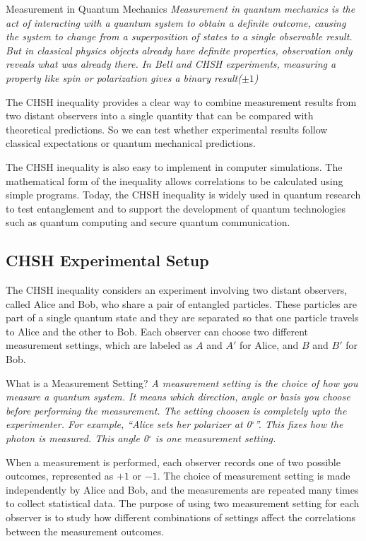 \documentclass[14pt,a4paper]{extarticle}
\begin{document}
\begin{conceptbox}{Measurement in Quantum Mechanics}
\textit{Measurement in quantum mechanics is the act of interacting with a quantum system to obtain a definite outcome, causing the system to change from a superposition of states to a single observable result. But in classical physics objects already have definite properties, observation only reveals what was already there. In Bell and CHSH experiments, measuring a property like spin or polarization gives a binary result($\pm1$)}
\end{conceptbox}

The CHSH inequality provides a clear way to combine measurement results from two distant observers into a single quantity that can be compared with theoretical predictions. So we can test whether experimental results follow classical expectations or quantum mechanical predictions.

The CHSH inequality is also easy to implement in computer simulations. The mathematical form of the inequality allows correlations to be calculated using simple programs. Today, the CHSH inequality is widely used in quantum research to test entanglement and to support the development of quantum technologies such as quantum computing and secure quantum communication.

\subsection{CHSH Experimental Setup}
The CHSH inequality considers an experiment involving two distant observers, called Alice and Bob, who share a pair of entangled particles. These particles are part of a single quantum state and they are separated so that one particle travels to Alice and the other to Bob. Each observer can choose two different measurement settings, which are labeled as $A$ and $A'$ for Alice, and $B$ and $B'$ for Bob.

\begin{conceptbox}{What is a Measurement Setting?}
\textit{A measurement setting is the choice of how you measure a quantum system. It means which direction, angle or basis you choose before performing the measurement. The setting choosen is completely upto the experimenter. For example, ``Alice sets her polarizer at 0$^\circ$''. This fixes how the photon is measured. This angle 0$^\circ$ is one measurement setting.}
\end{conceptbox}

When a measurement is performed, each observer records one of two possible outcomes, represented as $+1$ or $-1$. The choice of measurement setting is made independently by Alice and Bob, and the measurements are repeated many times to collect statistical data. The purpose of using two measurement setting for each observer is to study how different combinations of settings affect the correlations between the measurement outcomes.
\end{document}

